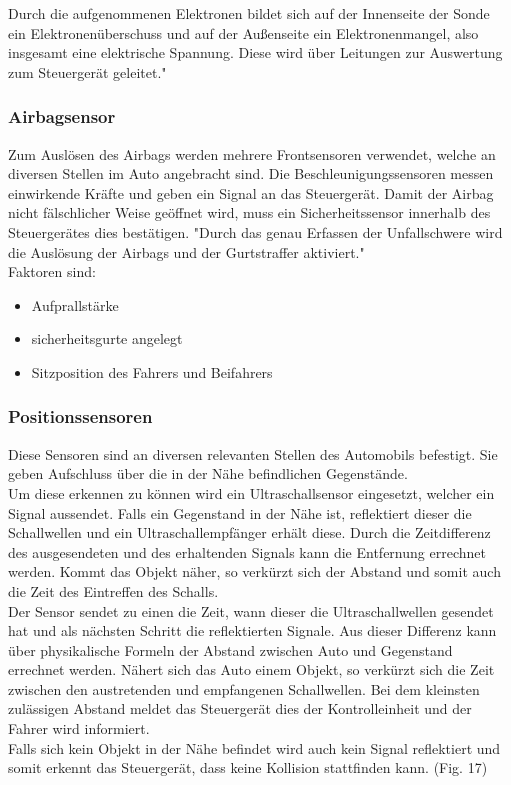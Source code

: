 					Durch die aufgenommenen Elektronen bildet sich auf der Innenseite der Sonde ein Elektronenüberschuss und auf der Außenseite ein Elektronenmangel, also insgesamt eine elektrische Spannung. Diese wird über Leitungen zur Auswertung zum Steuergerät geleitet."\cite{TS_lambda}
			
			\subsubsection{Airbagsensor}
					Zum Auslösen des Airbags werden mehrere Frontsensoren verwendet, welche an diversen Stellen im Auto angebracht sind. Die Beschleunigungssensoren messen einwirkende Kräfte und geben ein Signal an das Steuergerät. Damit der Airbag nicht fälschlicher Weise geöffnet wird, muss ein Sicherheitssensor innerhalb des Steuergerätes dies bestätigen. "Durch das genau Erfassen der Unfallschwere wird die Auslösung der Airbags und der Gurtstraffer aktiviert."\cite{TS_airbag}\\
					Faktoren sind: 
					
					\begin{itemize}
						\item Aufprallstärke
						\item sicherheitsgurte angelegt
						\item Sitzposition des Fahrers und Beifahrers
					\end{itemize}
				
				
				\subsubsection{Positionssensoren}
					Diese Sensoren sind an diversen relevanten Stellen des Automobils befestigt. Sie geben Aufschluss über die in der Nähe befindlichen Gegenstände.\\
					Um diese erkennen zu können wird ein Ultraschallsensor eingesetzt, welcher ein Signal aussendet. Falls ein Gegenstand in der Nähe ist, reflektiert dieser die Schallwellen und ein Ultraschallempfänger erhält diese. Durch die Zeitdifferenz des ausgesendeten und des erhaltenden Signals kann die Entfernung errechnet werden. Kommt das Objekt näher, so verkürzt sich der Abstand und somit auch die Zeit des Eintreffen des Schalls.\\
					Der Sensor sendet zu einen die Zeit, wann dieser die Ultraschallwellen gesendet hat und als nächsten Schritt die reflektierten Signale. Aus dieser Differenz kann über physikalische Formeln der Abstand zwischen Auto und Gegenstand errechnet werden. Nähert sich das Auto einem Objekt, so verkürzt sich die Zeit zwischen den austretenden und empfangenen Schallwellen. Bei dem kleinsten zulässigen Abstand meldet das Steuergerät dies der Kontrolleinheit und der Fahrer wird informiert.\\
					Falls sich kein Objekt in der Nähe befindet wird auch kein Signal reflektiert und somit erkennt das Steuergerät, dass keine Kollision stattfinden kann. (Fig. 17)
				
